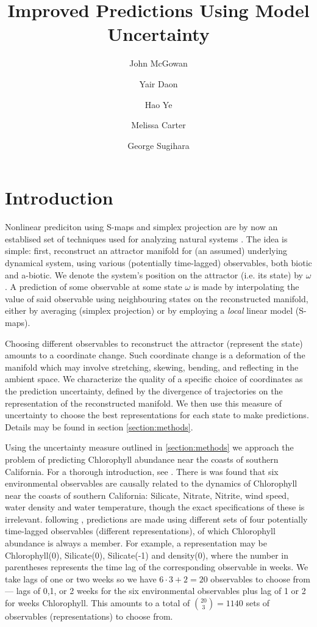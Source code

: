 \documentclass[fleqn,10pt]{wlscirep}
\title{Improved Predictions Using Model Uncertainty}
\author[2]{John McGowan}
\author[1,*]{Yair Daon}
\author[2]{Hao Ye}
\author[2]{Melissa Carter}
\author[2]{George Sugihara}
\affil[1]{NYU, Courant Institute of Mathematical Sciences, New York, NY 10012 USA}
\affil[2]{University of California San Diego, Scripps Institution of Oceanography, La Jolla, CA 92037, USA}
\affil[*]{yair.daon@gmail.com}
\affil[+]{these authors contributed equally to this work}
\begin{document}
\flushbottom
\maketitle

\thispagestyle{empty}

\section{Introduction}
Nonlinear prediciton using S-maps \cite{Smaps} and simplex projection
\cite{simplex} are by now an establised set of techniques used for
analyzing natural systems \cite{Salmon,Influenza,Neurons}. The idea is
simple: first, reconstruct an attractor manifold for (an assumed)
underlying dynamical system, using various (potentially time-lagged)
observables, both biotic and a-biotic. We denote the system's position
on the attractor (i.e. its state) by $\omega$. A prediction of some
observable at some state $\omega$ is made by interpolating the value of
said observable using neighbouring states on the reconstructed
manifold, either by averaging (simplex projection) or by employing a
\emph{local} linear model (S-maps).

Choosing different observables to reconstruct the attractor (represent
the state) amounts to a coordinate change. Such coordinate change is a
deformation of the manifold which may involve stretching, skewing,
bending, and reflecting in the ambient space. We characterize the
quality of a specific choice of coordinates as the prediction
uncertainty, defined by the divergence of trajectories on the
representation of the reconstructed manifold. We then use this measure
of uncertainty to choose the best representations for each state to
make predictions. Details may be found in section
\ref{section:methods}.

Using the uncertainty measure outlined in \ref{section:methods} we
approach the problem of predicting Chlorophyll abundance near the
coasts of southern California. For a thorough introduction, see
\cite{AlgaeBloom}. There is was found that six environmental
observables are causally related to the dynamics of Chlorophyll near
the coasts of southern California: Silicate, Nitrate, Nitrite, wind
speed, water density and water temperature, though the exact
specifications of these is irrelevant. following \cite{AlgaeBloom},
predictions are made using different sets of four potentially
time-lagged observables (different representations), of which
Chlorophyll abundance is always a member. For example, a
representation may be Chlorophyll(0), Silicate(0), Silicate(-1) and
density(0), where the number in parentheses represents the time lag of
the corresponding observable in weeks. We take lags of one or two
weeks so we have $6 \cdot 3 + 2 = 20$ observables to choose from ---
lags of 0,1, or 2 weeks for the six environmental observables plus lag
of 1 or 2 for weeks Chlorophyll. This amounts to a total of
$\binom{20}{3} = 1140$ sets of observables (representations) to choose
from.
\end{document}
